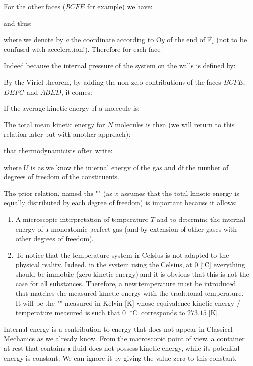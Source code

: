	For the other faces ($BCFE$ for example) we have:
	
	and thus:
	
	where we denote by $a$ the coordinate according to O$y$ of the end of $\vec{r}_i$ (not to be confused with acceleration!). Therefore for each face:
	
	Indeed because the internal pressure of the system on the walls is defined by:
	
	By the Viriel theorem, by adding the non-zero contributions of the faces $BCFE$, $DEFG$ and $ABED$, it comes:
	
	If the average kinetic energy of a molecule is:
	
	The total mean kinetic energy for $N$ molecules is then (we will return to this relation later but with another approach):
	
	that thermodynamicists often write:
	
	where $U$ is as we know the internal energy of the gas and df the number of degrees of freedom of the constituents.

	The prior relation, named the "" (as it assumes that the total kinetic energy is equally distributed by each degree of freedom) is important because it allows:
	\begin{enumerate}
		\item A microscopic interpretation of temperature $T$ and to determine the internal energy of a monoatomic perfect gas (and by extension of other gases with other degrees of freedom).

		\item To notice that the temperature system in Celsius is not adapted to the physical reality. Indeed, in the system using the Celsius, at $0$ [$^\circ$C] everything should be immobile (zero kinetic energy) and it is obvious that this is not the case for all substances. Therefore, a new temperature must be introduced that matches the measured kinetic energy with the traditional temperature. It will be the "" measured in Kelvin [K] whose equivalence kinetic energy / temperature measured is such that $0$ [$^\circ$C] corresponds to $273.15$ [K].
	\end{enumerate}
	Internal energy is a contribution to energy that does not appear in Classical Mechanics as we already know. From the macroscopic point of view, a container at rest that contains a fluid does not possess kinetic energy, while its potential energy is constant. We can ignore it by giving the value zero to this constant.

